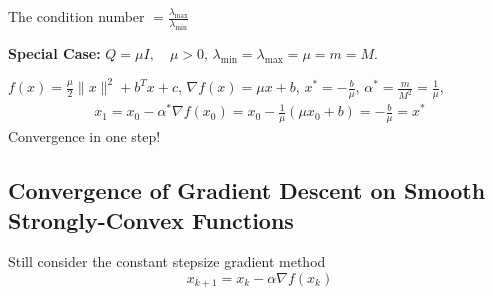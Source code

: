 \documentclass[11pt,a4paper]{article}
\begin{document}
The condition number $=\frac{\lambda_{\max}}{\lambda_{\min}}$

\textbf{Special Case:} $Q=\mu I,\quad \mu>0$, $\lambda_{\min}=\lambda_{\max}=\mu=m=M$.

$f(x)=\frac{\mu}{2}\|x\|^2+b^Tx+c$, $\nabla f(x)=\mu x+b$, $x^*=-\frac{b}{\mu}$, $\alpha^*=\frac{m}{M^2}=\frac{1}{\mu}$,
\begin{equation}
    \begin{aligned}
        x_1=x_0-\alpha^*\nabla f(x_0)=x_0-\frac{1}{\mu}(\mu x_0+b)=-\frac{b}{\mu}=x^*
    \end{aligned}
    \nonumber
\end{equation}
Convergence in one step!

\subsection{Convergence of Gradient Descent on Smooth Strongly-Convex Functions}
Still consider the constant stepsize gradient method$$x_{k+1}=x_k-\alpha \nabla f(x_k)$$
\end{document}
